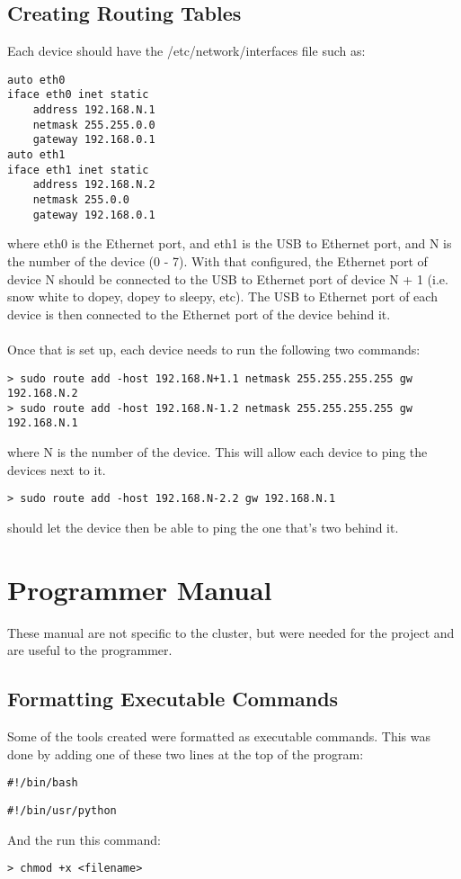 \subsection{Creating Routing Tables}
Each device should have the /etc/network/interfaces file such as: \\
\begin{lstlisting}
auto eth0
iface eth0 inet static
	address 192.168.N.1
	netmask 255.255.0.0
	gateway 192.168.0.1
auto eth1
iface eth1 inet static 
	address 192.168.N.2
	netmask 255.0.0
	gateway 192.168.0.1
\end{lstlisting}
where eth0 is the Ethernet port, and eth1 is the USB to Ethernet port, and N is the number of the device (0 - 7). With that configured, the Ethernet port of device N should be connected to the USB to Ethernet port of device N + 1 (i.e. snow white to dopey, dopey to sleepy, etc). The USB to Ethernet port of each device is then connected to the Ethernet port of the device behind it. \\ \\
Once that is set up, each device needs to run the following two commands:
\begin{lstlisting}
> sudo route add -host 192.168.N+1.1 netmask 255.255.255.255 gw 192.168.N.2
> sudo route add -host 192.168.N-1.2 netmask 255.255.255.255 gw 192.168.N.1
\end{lstlisting}
where N is the number of the device. This will allow each device to ping the devices next to it. 
\begin{lstlisting}
> sudo route add -host 192.168.N-2.2 gw 192.168.N.1
\end{lstlisting}
should let the device then be able to ping the one that's two behind it. 

\section{Programmer Manual}
These manual are not specific to the cluster, but were needed for the project and are useful to the programmer.
\subsection{Formatting Executable Commands}
Some of the tools created were formatted as executable commands. This was done by adding one of these two lines at the top of the program:
\begin{lstlisting}
#!/bin/bash
\end{lstlisting}
\begin{lstlisting}
#!/bin/usr/python
\end{lstlisting}
And the run this command:
\begin{lstlisting}
> chmod +x <filename>
\end{lstlisting}

